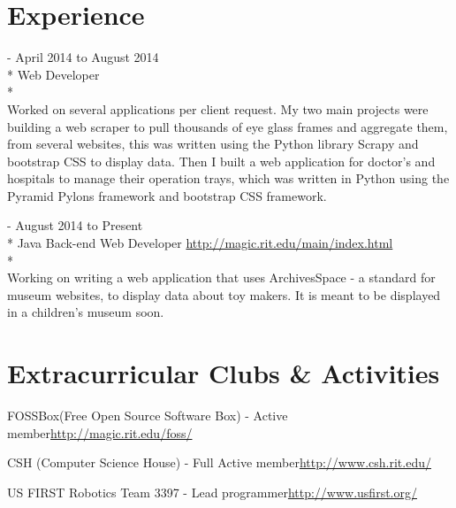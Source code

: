 \documentclass[a4paper,margin,line]{resume}
\newcommand{\rurl}[1]{\hfill {\footnotesize \url{#1}}}
\newcommand{\rdate}[1]{\hfill {\small #1}}
\renewcommand{\employer}[5]{\item[#1] - #2 \rdate{#3} \\* #4 \rurl{#5} \\*}
\begin{document}
\begin{resume}
\section{\mysidestyle Experience}
	\begin{asparadesc}
        \employer{Earth Moves}{April 2014 to August 2014}{}{Web Developer}{}
        \\
		\small
        Worked on several applications per client request. My two main projects
        were building a web scraper to pull thousands of eye glass frames and
        aggregate them, from several websites, this was written using the Python
        library Scrapy and bootstrap CSS to display data. Then I built a web
        application for doctor's and hospitals to manage their operation trays,
        which was written in Python using the Pyramid Pylons framework and
        bootstrap CSS framework. \normalsize
		\\
		\employer{Magic@Rochester Institute of Technology}{August 2014 to Present}{}{Java Back-end Web Developer}{http://magic.rit.edu/main/index.html}
        \\
		\small
        Working on writing a web application that uses ArchivesSpace - a
        standard for museum websites, to display data about toy makers. It is
        meant to be displayed in a children's museum soon. \end{asparadesc}
\section{\mysidestyle Extracurricular Clubs \& Activities}
	\begin{asparablank}
        \item FOSSBox({\small Free Open Source Software Box}) - Active member\rurl{http://magic.rit.edu/foss/}
		\item CSH ({\small Computer Science House}) - Full Active member\rurl{http://www.csh.rit.edu/}
		\item US FIRST Robotics Team 3397 - {\small Lead programmer}\rurl{http://www.usfirst.org/}
	\end{asparablank}

\end{resume}
\end{document}
